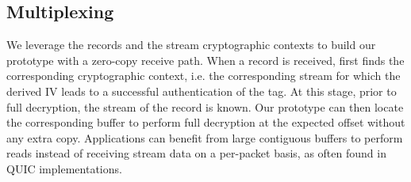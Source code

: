 \subsection{Multiplexing}
\label{sec:prot-multiplexing}

We leverage the \tcpls records and the \tcpls stream cryptographic contexts to 
build our prototype with a zero-copy receive path. When a record is received,
\tcpls first finds the corresponding cryptographic context, i.e. the
corresponding \tcpls stream for which the derived IV leads to a successful
authentication of the tag. At this stage, prior to full decryption, the 
\tcpls stream of the record is known. Our prototype can then locate the 
corresponding buffer
to perform full decryption at the expected offset without any extra copy.
Applications can benefit from large contiguous
buffers to perform reads instead of receiving stream data on a per-packet basis,
as often found in QUIC implementations.


%
%



